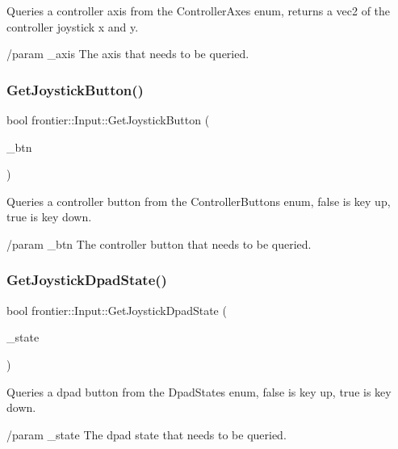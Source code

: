 Queries a controller axis from the Controller\+Axes enum, returns a vec2 of the controller joystick x and y. 

/param \+\_\+axis The axis that needs to be queried. \mbox{\label{classfrontier_1_1_input_a1e208f9684151e5d11dcf3376e4b99a3}} 
\subsubsection{\texorpdfstring{Get\+Joystick\+Button()}{GetJoystickButton()}}
{\footnotesize\ttfamily bool frontier\+::\+Input\+::\+Get\+Joystick\+Button (\begin{DoxyParamCaption}\item[{\hyperlink{classfrontier_1_1_input_affa0331a173268233d6630184a105bb6}{Controller\+Buttons}}]{\+\_\+btn }\end{DoxyParamCaption})}



Queries a controller button from the Controller\+Buttons enum, false is key up, true is key down. 

/param \+\_\+btn The controller button that needs to be queried. \mbox{\label{classfrontier_1_1_input_a48d6f21151c9cc7ed93b386d0be25bf0}} 
\subsubsection{\texorpdfstring{Get\+Joystick\+Dpad\+State()}{GetJoystickDpadState()}}
{\footnotesize\ttfamily bool frontier\+::\+Input\+::\+Get\+Joystick\+Dpad\+State (\begin{DoxyParamCaption}\item[{\hyperlink{classfrontier_1_1_input_a53a85fe24f5b35e1a42ab370dcd0d94e}{Dpad\+States}}]{\+\_\+state }\end{DoxyParamCaption})}



Queries a dpad button from the Dpad\+States enum, false is key up, true is key down. 

/param \+\_\+state The dpad state that needs to be queried. \mbox{\label{classfrontier_1_1_input_a010a90cb5ee5fe7c13e5e5fa74728bfa}} 
